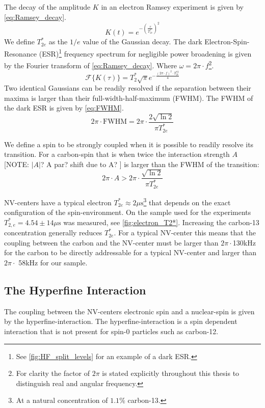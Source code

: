 The decay of the amplitude $K$ in an electron Ramsey experiment is given by \cref{eq:Ramsey_decay}.
\begin{equation}
    K(t) = e^{-(\tfrac{\tau}{T_{2e}^*})^2}
    \label{eq:Ramsey_decay}
\end{equation}
We define $T_{2e}^*$ as the $1/e$ value of the Gaussian decay. The dark Electron-Spin-Resonance (ESR)\footnote{See \cref{fig:HF_split_levels} for an example of a dark ESR.} frequency spectrum for negligible power broadening is given by the Fourier transform of \cref{eq:Ramsey_decay}. Where $\omega = 2\pi \cdot f$\footnote{For clarity the factor of $2\pi$ is stated explicitly throughout this thesis to distinguish real and angular frequency. }.
\begin{equation}
    \mathcal{F} \{ K(\tau) \} =  T_2^* \sqrt{\pi} e^{-\tfrac{(2\pi \cdot f) ^2 \cdot T_{2e}^{*2}}{ 4}}
\end{equation}
Two identical Gaussians can be readily resolved if the separation between their maxima is larger than their full-width-half-maximum (FWHM).
The FWHM of the dark ESR is given by \cref{eq:FWHM}.
\begin{equation}
    2\pi \cdot \mathrm{FWHM} = 2\pi \cdot \frac{2\sqrt{\ln{2}}}{\pi T_{2e}^*}
    \label{eq:FWHM}
\end{equation}

We define a spin to be strongly coupled when it is possible to readily resolve its transition.
For a carbon-spin that is when twice the interaction strength $A$ [NOTE: $|A|$? A par? shift due to A? ] is larger than the FWHM of the transition:
\begin{equation}
     2\pi \cdot A> 2\pi \cdot \frac{\sqrt{\ln{2}}}{\pi T_{2e}^*}
     \label{eq:def_strongly_coupled}
 \end{equation}

NV-centers have a typical electron $T_{2e}^* \approx 2\mu \mathrm{s}$\footnote{At a natural concentration of $1.1 \%$ carbon-13.} that depends on the exact configuration of the spin-environment.
On the sample used for the experiments $T_{2,e}^* = 4.54 \pm 14 \mu\mathrm{s}$ was measured, see \cref{fig:electron_T2*}.
Increasing the carbon-13 concentration generally reduces $T_{2e}^*$.
For a typical NV-center this means that the coupling between the carbon and the NV-center must be larger than $2\pi\cdot$130kHz for the carbon to be directly addressable for a typical NV-center and larger than $2\pi\cdot$ 58kHz for our sample.


\subsection{The Hyperfine Interaction}
The coupling between the NV-centers electronic spin and a nuclear-spin is given by the hyperfine-interaction. The hyperfine-interaction is a spin dependent interaction that is not present for spin-0 particles such as carbon-12.

